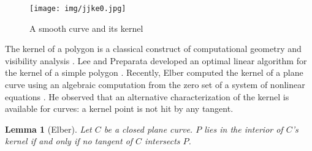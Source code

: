 \documentclass{sig-alternate}
\newif\ifJournal
\newcommand{\QED}{\vrule height 1.4ex width 1.0ex depth -.1ex\ \vspace{.3in}} %
\newcommand{\lyne}[1]{\mbox{$\stackrel{\leftrightarrow}{#1}$}}
\newcommand{\seg}[1]{\mbox{$\overline{#1}$}}
\newcommand{\prf}{\noindent{{\bf Proof}:\ \ \ }}
\newtheorem{lemma}[theorem]{Lemma}
\begin{document}
\begin{figure}[h]
\begin{center}
\texttt{[image: img/jjke0.jpg]}
\end{center}
\caption{A smooth curve and its kernel}
\label{fig:curveob1b}
\end{figure}

The kernel of a polygon is a classical construct of computational geometry
\cite{goodman97,preparata85} and visibility analysis \cite{orourke87}.
Lee and Preparata developed an optimal linear algorithm 
for the kernel of a simple polygon \cite{lee79}.
Recently, Elber computed the kernel of a plane curve using 
an algebraic computation from the zero set of a system of nonlinear equations
\cite{elber02}.
He observed that 
an alternative characterization of the kernel is available for curves:
a kernel point is not hit by any tangent.

\begin{lemma}[Elber]
\label{lem:primalkernelchar}
Let $C$ be a closed plane curve.
$P$ lies in the interior of $C$'s kernel if and only if 
no tangent of $C$ intersects $P$.
\end{lemma}
\ifJournal
\prf
If $P$ does not lie in the kernel,
then $P$ does not see some point $Q \in C$.
That is, $\seg{PQ}$ hits the curve in a second point.
By rotating the line $\lyne{PQ}$ about $P$,
the intersection points can be transformed into a point of tangency.
That is, if $P$ does not lie in the kernel, then it is hit by some tangent.
As a limit case of $\seg{PQ} \cap C \neq \emptyset$,
a point of the kernel boundary will also be hit by some tangent.
We conclude that if no tangent of $C$ intersects $P$, then $P$ must lie in the interior of the kernel.

If a tangent at $Q \in C$ hits $P$, then $P'Q$ will hit $C$ twice for some point $P'$ in the neighbourhood 
of $P$.
Thus, if $P$ lies in the interior of the kernel, no tangent of $C$ can intersect $P$.
\QED
\fi
\end{document}
